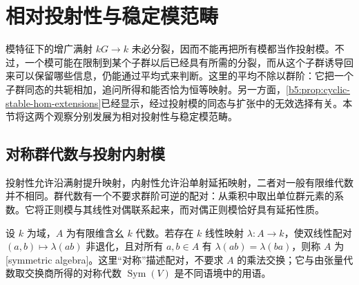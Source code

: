
\section{相对投射性与稳定模范畴}
\label{b5:sec:0805}

模特征下的增广满射 \(kG\to k\) 未必分裂，因而不能再把所有模都当作投射模。不过，一个模可能在限制到某个子群以后已经具有所需的分裂，而从这个子群诱导回来可以保留哪些信息，仍能通过平均式来判断。这里的平均不除以群阶：它把一个子群同态的共轭相加，追问所得和能否恰为恒等映射。另一方面，\cref{b5:prop:cyclic-stable-hom-extensions}已经显示，经过投射模的同态与扩张中的无效选择有关。本节将这两个观察分别发展为相对投射性与稳定模范畴。

\subsection{对称群代数与投射内射模}
\label{b5:subsec:0805:01}

投射性允许沿满射提升映射，内射性允许沿单射延拓映射，二者对一般有限维代数并不相同。群代数有一个不要求群阶可逆的配对：从乘积中取出单位群元素的系数。它将正则模与其线性对偶联系起来，而对偶正则模恰好具有延拓性质。

\begin{definition}\label{b5:def:symmetric-algebra}
	设 \(k\) 为域，\(A\) 为有限维含幺 \(k\) 代数。若存在 \(k\) 线性映射 \(\lambda:A\to k\)，使双线性配对 \((a,b)\mapsto\lambda(ab)\) 非退化，且对所有 \(a,b\in A\) 有 \(\lambda(ab)=\lambda(ba)\)，则称 \(A\) 为[symmetric algebra]。这里“对称”描述配对，不要求 \(A\) 的乘法交换；它与由张量代数取交换商所得的对称代数 \(\operatorname{Sym}(V)\) 是不同语境中的用语。
\end{definition}


